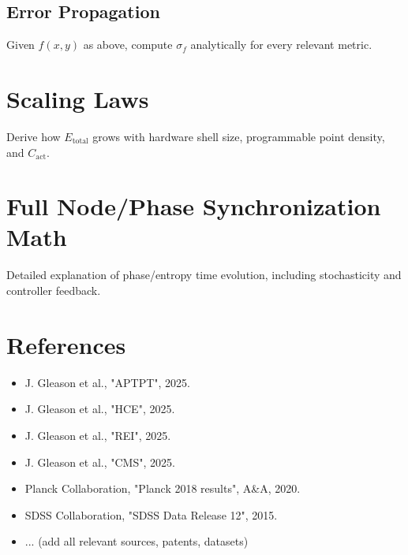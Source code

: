 \documentclass[12pt]{article}
\begin{document}
\subsection{Error Propagation}
Given $f(x, y)$ as above, compute $\sigma_f$ analytically for every relevant metric.

\section{Scaling Laws}
Derive how $E_{\text{total}}$ grows with hardware shell size, programmable point density, and $C_{\text{act}}$.

\section{Full Node/Phase Synchronization Math}
Detailed explanation of phase/entropy time evolution, including stochasticity and controller feedback.

\section{References}
\label{sec:refs}
\begin{itemize}
    \item J. Gleason et al., "APTPT", 2025.
    \item J. Gleason et al., "HCE", 2025.
    \item J. Gleason et al., "REI", 2025.
    \item J. Gleason et al., "CMS", 2025.
    \item Planck Collaboration, "Planck 2018 results", A\&A, 2020.
    \item SDSS Collaboration, "SDSS Data Release 12", 2015.
    \item ... (add all relevant sources, patents, datasets)
\end{itemize}
\end{document}

